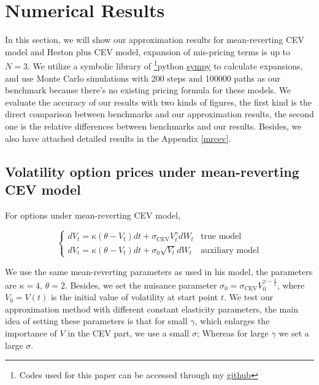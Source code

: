 \chapter{Numerical Results}\label{ch4}

In this section, we will show our approximation results for mean-reverting CEV model and Heston plus CEV model, expansion of mis-pricing terms is up to $N=3$. We utilize a symbolic library of \footnote{Codes used for this paper can be accessed through my \href{https://github.com/ywang408/master-thesis-code}{github}}{python} \href{https://www.sympy.org/en/index.html}{sympy} to calculate expansions, and use Monte Carlo simulations with 200 steps and 100000 paths as our benchmark because there's no existing pricing formula for these models. We evaluate the accuracy of our results with two kinds of figures, the first kind is the direct comparison between benchmarks and our approximation results, the second one is the relative differences between benchmarks and our results. Besides, we also have attached detailed results in the Appendix \ref{mrcev}.

\section{Volatility option prices under mean-reverting CEV model}

For options under mean-reverting CEV model,

$$
  \begin{cases}
    d V_t=\kappa(\theta - V_t) d t+\sigma_{\text{CEV}} V^{\gamma}_t d W_t &\text{true model}\\
    d V_t=\kappa(\theta - V_t) d t+\sigma_0 \sqrt{V_t} d W_t &\text{auxiliary model}
  \end{cases}
$$

We use the same mean-reverting parameters as \cite{grunbichler_valuing_1996} used in his model, the parameters are $\kappa=4$, $\theta=2$. Besides, we set the nuisance parameter $\sigma_0 = \sigma_{\text{CEV}} V_0^{\gamma-\frac{1}{2}}$, where $V_0=V(t)$ is the initial value of volatility at start point $t$. We test our approximation method with different constant elasticity parameters, the main idea of setting these parameters is that for small $\gamma$, which enlarges the importance of $V$ in the CEV part, we use a small $\sigma$; Whereas for large $\gamma$ we set a large $\sigma$. 


